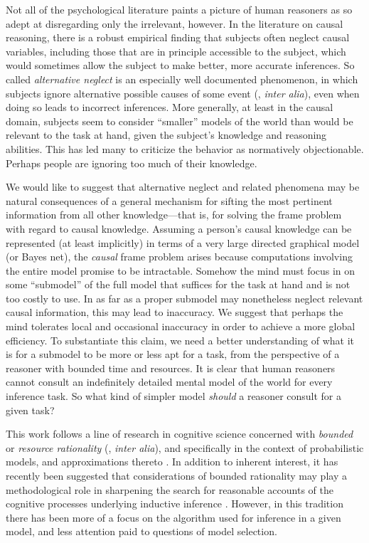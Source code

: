 \documentclass[10pt,letterpaper]{article}
\begin{document}
Not all of the psychological literature paints a picture of human reasoners as so adept at disregarding only the irrelevant, however. In the literature on causal reasoning, there is a robust empirical finding that subjects often neglect causal variables, including those that are in principle accessible to the subject, which would sometimes allow the subject to make better, more accurate inferences. So called \emph{alternative neglect} is an especially well documented phenomenon, in which subjects ignore alternative possible causes of some event (\citealt{Fischhoff1978,KlaymanHa,Fernbach2011}, \emph{inter alia}), even when doing so leads to incorrect inferences. More generally, at least in the causal domain, subjects seem to consider ``smaller'' models of the world than would be relevant to the task at hand, given the subject's knowledge and reasoning abilities. This has led many to criticize the behavior as normatively objectionable. Perhaps people are ignoring too much of their knowledge.

We would like to suggest that alternative neglect and related phenomena may be natural consequences of a general mechanism for sifting the most pertinent information from all other knowledge---that is, for solving the frame problem with regard to causal knowledge. Assuming a person's causal knowledge can be represented (at least implicitly) in terms of a very large directed graphical model (or Bayes net), the \emph{causal} frame problem arises because computations involving the entire model promise to be intractable. Somehow the mind must focus in on some ``submodel'' of the full model that suffices for the task at hand and is not too costly to use. In as far as a proper submodel may nonetheless neglect relevant causal information, this may lead to inaccuracy. We suggest that perhaps the mind tolerates local and occasional inaccuracy in order to achieve a more global efficiency. 
To substantiate this claim, we need a better understanding of what it is for a submodel to be more or less apt for a task, from the perspective of a reasoner with bounded time and resources. It is clear that human reasoners cannot consult an indefinitely detailed mental model of the world for every inference task. So what kind of simpler model \emph{should} a reasoner consult for a given task?

This work follows a line of research in cognitive science concerned with \emph{bounded} or \emph{resource rationality} (\citealt{Simon1957,Gigerenzer1996}, \emph{inter alia}), and specifically in the context of probabilistic models, and approximations thereto \citep{Vul2014}. In addition to inherent interest, it has recently been suggested that considerations of bounded rationality may play a methodological role in sharpening the search for reasonable accounts of the cognitive processes underlying inductive inference \citep{Griffiths2014,Icard2014}. However, in this tradition there has been more of a focus on the algorithm used for inference in a given model, and less attention paid to questions of model selection.
\end{document}
